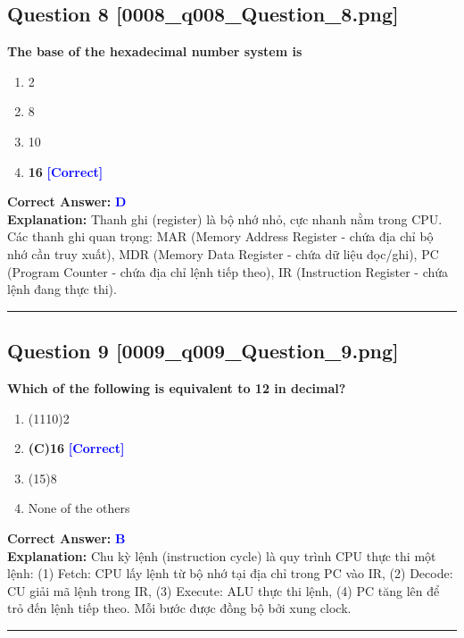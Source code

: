 \documentclass[11pt,a4paper]{article}
\begin{document}
\begin{minipage}{\textwidth}
\subsection*{Question 8 \quad \footnotesize{[0008\_q008\_Question\_8.png]}}
\noindent \textbf{The base of the hexadecimal number system is}

\begin{enumerate}[label=\Alph*.]
    \item 2
    \item 8
    \item 10
    \item \textbf{16} \hfill \textcolor{blue}{\textbf{[Correct]}}
\end{enumerate}

\noindent \textbf{Correct Answer:} \textcolor{blue}{\textbf{D}} \\[2pt]
\noindent \textbf{Explanation:} Thanh ghi (register) là bộ nhớ nhỏ, cực nhanh nằm trong CPU. Các thanh ghi quan trọng: MAR (Memory Address Register - chứa địa chỉ bộ nhớ cần truy xuất), MDR (Memory Data Register - chứa dữ liệu đọc/ghi), PC (Program Counter - chứa địa chỉ lệnh tiếp theo), IR (Instruction Register - chứa lệnh đang thực thi).

\par\vspace{0.3cm}
\hrule
\vspace{0.3cm}
\end{minipage}

\begin{minipage}{\textwidth}
\subsection*{Question 9 \quad \footnotesize{[0009\_q009\_Question\_9.png]}}
\noindent \textbf{Which of the following is equivalent to 12 in decimal?}

\begin{enumerate}[label=\Alph*.]
    \item (1110)2
    \item \textbf{(C)16} \hfill \textcolor{blue}{\textbf{[Correct]}}
    \item (15)8
    \item None of the others
\end{enumerate}

\noindent \textbf{Correct Answer:} \textcolor{blue}{\textbf{B}} \\[2pt]
\noindent \textbf{Explanation:} Chu kỳ lệnh (instruction cycle) là quy trình CPU thực thi một lệnh: (1) Fetch: CPU lấy lệnh từ bộ nhớ tại địa chỉ trong PC vào IR, (2) Decode: CU giải mã lệnh trong IR, (3) Execute: ALU thực thi lệnh, (4) PC tăng lên để trỏ đến lệnh tiếp theo. Mỗi bước được đồng bộ bởi xung clock.

\par\vspace{0.3cm}
\hrule
\vspace{0.3cm}
\end{minipage}
\end{document}
